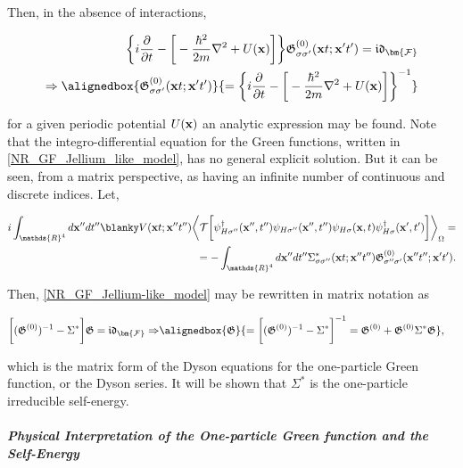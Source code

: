 Then, in the absence of interactions, 

\begin{align}
  {\bigg\{ i\frac{\partial}{\partial t} - \bigg[-\frac{\hbar^2}{2m} \nabla^2 + U({\bf x})\bigg] \bigg\} \mathfrak{G}^{(0)}_{\sigma \sigma'}({\bf x} t; {\bf x}' t')} =  \mathfrak{i}\mathfrak{d}_{\bm{\mathcal{F}}} \\
  \Rightarrow \alignedbox{ \mathfrak{G}^{(0)}_{\sigma \sigma'}({\bf x} t; {\bf x}' t')}{ = \bigg\{ i\frac{\partial}{\partial t} - \bigg[-\frac{\hbar^2}{2m} \nabla^2 + U({\bf x})\bigg] \bigg\}^{-1}}
\end{align}

for a given periodic potential $U({\bf x})$ an analytic expression may be found. Note that the integro-differential equation for the Green functions, written in \cref{NR_GF_Jellium_like_model}, has no general explicit solution. But it can be seen, from a matrix perspective, as having an infinite number of continuous and discrete indices. Let, 

\begin{align*}
    i\int_{\mathds{R}^4} d{\bf x}'' dt'' \blanky V({\bf x}t; {\bf x}'' t'') \bigg\langle \mathcal{T} \bigg[ \psi^\dagger_{H \sigma''}({\bf x}'', t'') \psi_{H \sigma''}({\bf x}'', t'') \psi_{H \sigma}({\bf x}, t) \psi_{H \sigma}^\dagger({\bf x}', t') \bigg] \bigg \rangle_{\Omega} = \\
    = - \int_{\mathds{R}^4} d{\bf x}'' dt''\Sigma_{\sigma \sigma''}^{*}({\bf x} t; {\bf x}'' t'')  \mathfrak{G}^{(0)}_{\sigma'' \sigma'}({\bf x}'' t''; {\bf x}' t').
\end{align*}

Then, \cref{NR_GF_Jellium-like_model} may be rewritten in matrix notation as 

\begin{align}
    \bigg[(\mathfrak{G}^{(0)})^{-1} - \Sigma^{*}\bigg] \mathfrak{G} = \mathfrak{i}\mathfrak{d}_{\bm{\mathcal{F}}} \Rightarrow &  \alignedbox{\mathfrak{G} }{= \bigg[(\mathfrak{G}^{(0)})^{-1} - \Sigma^{*}\bigg]^{-1} = \mathfrak{G}^{(0)} + \mathfrak{G}^{(0)} \Sigma^{*} \mathfrak{G}},
\end{align}

which is the matrix form of the Dyson equations for the one-particle Green function, or the Dyson series. It will be shown that $\Sigma^{*}$ is the one-particle irreducible self-energy. \\

\paragraph{\textit{Physical Interpretation of the One-particle Green function and the Self-Energy}}

